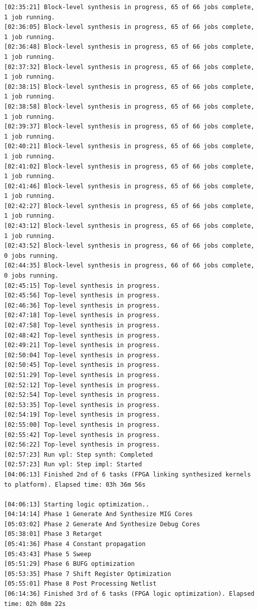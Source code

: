 \begin{lstlisting}[label=code, basicstyle=\tiny, caption=Листинг файла v++\_vinc.log]
[02:35:21] Block-level synthesis in progress, 65 of 66 jobs complete, 1 job running.
[02:36:05] Block-level synthesis in progress, 65 of 66 jobs complete, 1 job running.
[02:36:48] Block-level synthesis in progress, 65 of 66 jobs complete, 1 job running.
[02:37:32] Block-level synthesis in progress, 65 of 66 jobs complete, 1 job running.
[02:38:15] Block-level synthesis in progress, 65 of 66 jobs complete, 1 job running.
[02:38:58] Block-level synthesis in progress, 65 of 66 jobs complete, 1 job running.
[02:39:37] Block-level synthesis in progress, 65 of 66 jobs complete, 1 job running.
[02:40:21] Block-level synthesis in progress, 65 of 66 jobs complete, 1 job running.
[02:41:02] Block-level synthesis in progress, 65 of 66 jobs complete, 1 job running.
[02:41:46] Block-level synthesis in progress, 65 of 66 jobs complete, 1 job running.
[02:42:27] Block-level synthesis in progress, 65 of 66 jobs complete, 1 job running.
[02:43:12] Block-level synthesis in progress, 65 of 66 jobs complete, 1 job running.
[02:43:52] Block-level synthesis in progress, 66 of 66 jobs complete, 0 jobs running.
[02:44:35] Block-level synthesis in progress, 66 of 66 jobs complete, 0 jobs running.
[02:45:15] Top-level synthesis in progress.
[02:45:56] Top-level synthesis in progress.
[02:46:36] Top-level synthesis in progress.
[02:47:18] Top-level synthesis in progress.
[02:47:58] Top-level synthesis in progress.
[02:48:42] Top-level synthesis in progress.
[02:49:21] Top-level synthesis in progress.
[02:50:04] Top-level synthesis in progress.
[02:50:45] Top-level synthesis in progress.
[02:51:29] Top-level synthesis in progress.
[02:52:12] Top-level synthesis in progress.
[02:52:54] Top-level synthesis in progress.
[02:53:35] Top-level synthesis in progress.
[02:54:19] Top-level synthesis in progress.
[02:55:00] Top-level synthesis in progress.
[02:55:42] Top-level synthesis in progress.
[02:56:22] Top-level synthesis in progress.
[02:57:23] Run vpl: Step synth: Completed
[02:57:23] Run vpl: Step impl: Started
[04:06:13] Finished 2nd of 6 tasks (FPGA linking synthesized kernels to platform). Elapsed time: 03h 36m 56s 

[04:06:13] Starting logic optimization..
[04:14:14] Phase 1 Generate And Synthesize MIG Cores
[05:03:02] Phase 2 Generate And Synthesize Debug Cores
[05:38:01] Phase 3 Retarget
[05:41:36] Phase 4 Constant propagation
[05:43:43] Phase 5 Sweep
[05:51:29] Phase 6 BUFG optimization
[05:53:35] Phase 7 Shift Register Optimization
[05:55:01] Phase 8 Post Processing Netlist
[06:14:36] Finished 3rd of 6 tasks (FPGA logic optimization). Elapsed time: 02h 08m 22s 


\end{lstlisting}
